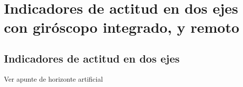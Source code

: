 
\section{Indicadores  de actitud en dos ejes con gir\'oscopo integrado, y remoto}
\label{sec:indicadores.actitud.2.ejes}

\subsection{Indicadores de actitud en dos ejes}
\label{sec:indicadores.actitud.2.ejes.basico}

\begin{frame}

Ver apunte de horizonte artificial
  
\end{frame}

